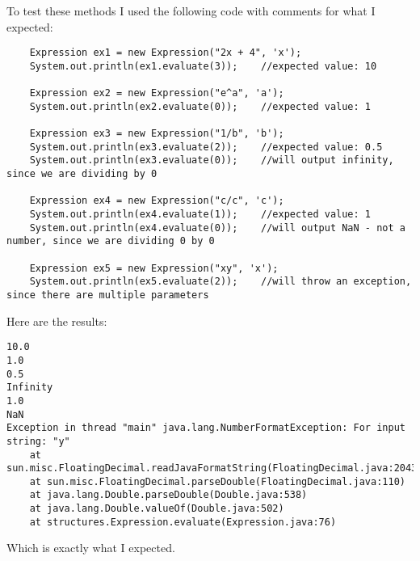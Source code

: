 \documentclass[../../../../main.tex]{subfiles}
\begin{document}
To test these methods I used the following code with comments for what I expected:
\begin{verbatim}
	Expression ex1 = new Expression("2x + 4", 'x');
	System.out.println(ex1.evaluate(3));	//expected value: 10
	
	Expression ex2 = new Expression("e^a", 'a');
	System.out.println(ex2.evaluate(0));	//expected value: 1
	
	Expression ex3 = new Expression("1/b", 'b');
	System.out.println(ex3.evaluate(2));	//expected value: 0.5
	System.out.println(ex3.evaluate(0));	//will output infinity, since we are dividing by 0
	
	Expression ex4 = new Expression("c/c", 'c');
	System.out.println(ex4.evaluate(1));	//expected value: 1
	System.out.println(ex4.evaluate(0));	//will output NaN - not a number, since we are dividing 0 by 0
	
	Expression ex5 = new Expression("xy", 'x');
	System.out.println(ex5.evaluate(2));	//will throw an exception, since there are multiple parameters
\end{verbatim}
Here are the results:
\begin{verbatim}
10.0
1.0
0.5
Infinity
1.0
NaN
Exception in thread "main" java.lang.NumberFormatException: For input string: "y"
	at sun.misc.FloatingDecimal.readJavaFormatString(FloatingDecimal.java:2043)
	at sun.misc.FloatingDecimal.parseDouble(FloatingDecimal.java:110)
	at java.lang.Double.parseDouble(Double.java:538)
	at java.lang.Double.valueOf(Double.java:502)
	at structures.Expression.evaluate(Expression.java:76)
\end{verbatim}
Which is exactly what I expected.
\newpage
\end{document}

